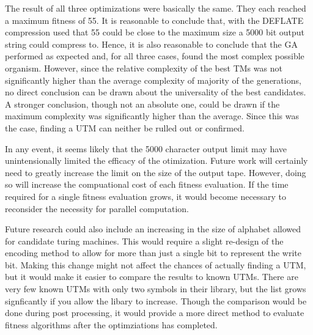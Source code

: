 The result of all three optimizations were basically the same. They each reached a maximum fitness of 55. It is reasonable to conclude that, with the DEFLATE compression used that 55 could be close to the maximum size a 5000 bit output string could compress to. Hence, it is also reasonable to conclude that the GA performed as expected and, for all three cases, found the most complex possible organism. However, since the relative complexity of the best TMs was not significantly higher than the average complexity of majority of the generations, no direct conclusion can be drawn about the universality of the best candidates. A stronger conclusion, though not an absolute one, could be drawn if the maximum complexity was significantly higher than the average. Since this was the case, finding a UTM can neither be rulled out or confirmed. 

In any event, it seems likely that the 5000 character output limit may have unintensionally limited the efficacy of the otimization. Future work will certainly need to greatly increase the limit on the size of the output tape. However, doing so will increase the compuational cost of each fitness evaluation. If the time required for a single fitness evaluation grows, it would become necessary to reconsider the necessity for parallel computation. 

Future research could also include an increasing in the size of alphabet allowed for candidate turing machines. This would require a slight re-design of the encoding method to allow for more than just a single bit to represent the write bit. Making this change might not affect the chances of actually finding a UTM, but it would make it easier to compare the results to known UTMs. There are very few known UTMs with only two symbols in their library, but the list grows signficantly if you allow the libary to increase. Though the comparison would be done during post processing, it would provide a more direct method to evaluate fitness algorithms after the optimziations has completed. 

\clearpage